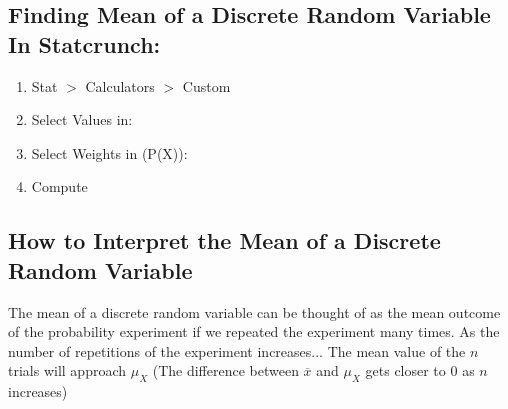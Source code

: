 \documentclass{report}
\begin{document}
      \bigbreak \noindent \bigbreak \noindent 
      \subsection*{Finding Mean of a Discrete Random Variable In Statcrunch:}
      \bigbreak \noindent 
      \begin{enumerate}
          \item Stat $> $ Calculators $> $ Custom
          \item Select Values in:
          \item Select Weights in (P(X)):
          \item Compute
      \end{enumerate}

      \bigbreak \noindent \bigbreak \noindent 
      \subsection*{How to Interpret the Mean of a Discrete Random Variable}
      \bigbreak \noindent 
        The mean of a discrete random variable can be thought of as the mean outcome of the probability experiment if we repeated the experiment many times. 
      \bigbreak \noindent 
      As the number of repetitions of the experiment increases... The mean value of the $n $ trials will approach $\mu_{X}$ (The difference between $\overline{x} $ and $\mu_{X} $ gets closer to 0 as $n$ increases)

      \pagebreak 
\end{document}
